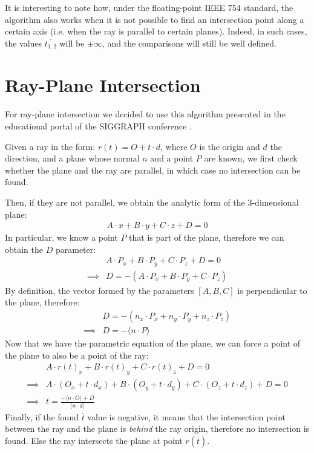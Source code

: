 \documentclass{PoliMi_MasterThesis}
\begin{document}
It is interesting to note how, under the floating-point IEEE 754 standard, the algorithm also works when it is not possible to find an intersection point along a certain axis (i.e. when the ray is parallel to certain planes). Indeed, in such cases, the values $\overline{t_{1,2}}$ will be $\pm \infty$, and the comparisons will still be well defined.

\section{Ray-Plane Intersection} \label{sec:ray_plane_intersection}
For ray-plane intersection we decided to use this algorithm presented in the educational portal of the SIGGRAPH conference \cite{ray_plane_intersection}.

Given a ray in the form: $r(t) = O + t\cdot d$, where $O$ is the origin and $d$ the direction, and a plane whose normal $n$ and a point $P$ are known, we first check whether the plane and the ray are parallel, in which case no intersection can be found.

Then, if they are not parallel, we obtain the analytic form of the 3-dimensional plane: 
\begin{align*}
	A\cdot x + B\cdot y + C\cdot z + D = 0
\end{align*}
In particular, we know a point $P$ that is part of the plane, therefore we can obtain the $D$ parameter:
\begin{align*}
&A\cdot P_x + B\cdot P_y + C\cdot P_z + D = 0\\
\implies& D = -(A\cdot P_x + B\cdot P_y + C\cdot P_z)
\end{align*}
By definition, the vector formed by the parameters $[A,B,C]$ is perpendicular to the plane, therefore:
\begin{align*}
&D = -(n_x\cdot P_x + n_y\cdot P_y + n_z\cdot P_z)\\
\implies& D = -\langle n \cdot P \rangle
\end{align*}
Now that we have the parametric equation of the plane, we can force a point of the plane to also be a point of the ray: 
\begin{align*}
	&A\cdot r(t)_x + B\cdot r(t)_y + C\cdot r(t)_z + D = 0\\
	\implies& A\cdot (O_x + t\cdot d_x) + B\cdot (O_y + t\cdot d_y) + C\cdot (O_z + t\cdot d_z) + D = 0\\
	\implies& t = \frac{-\langle n\cdot O \rangle + D}{\langle n\cdot d \rangle}
\end{align*}
Finally, if the found $\overline{t}$ value is negative, it means that the intersection point between the ray and the plane is \textit{behind} the ray origin, therefore no intersection is found. Else the ray intersects the plane at point $r(\overline{t})$.
\end{document}
